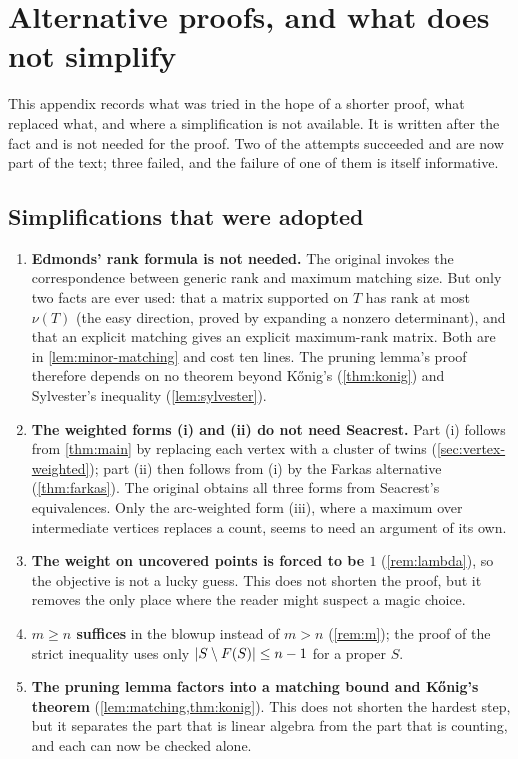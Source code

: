 \section{Alternative proofs, and what does not simplify}\label{app:alternatives}

This appendix records what was tried in the hope of a shorter proof, what replaced what, and where a
simplification is not available. It is written after the fact and is not needed for the proof. Two of
the attempts succeeded and are now part of the text; three failed, and the failure of one of them is
itself informative.

\subsection*{Simplifications that were adopted}

\begin{enumerate}[leftmargin=1.5em,itemsep=3pt,topsep=2pt]
\item \textbf{Edmonds' rank formula is not needed.} The original invokes the correspondence between
 generic rank and maximum matching size. But only two facts are ever used: that a matrix supported on
 $T$ has rank at most $\nu(T)$ (the easy direction, proved by expanding a nonzero determinant), and
 that an explicit matching gives an explicit maximum-rank matrix. Both are in
 \cref{lem:minor-matching} and cost ten lines. The pruning lemma's proof therefore depends on no
 theorem beyond K\H{o}nig's (\cref{thm:konig}) and Sylvester's inequality
 (\cref{lem:sylvester}).
\item \textbf{The weighted forms (i) and (ii) do not need Seacrest.} Part (i) follows from
 \cref{thm:main} by replacing each vertex with a cluster of twins (\cref{sec:vertex-weighted}); part
 (ii) then follows from (i) by the Farkas alternative (\cref{thm:farkas}). The original obtains all
 three forms from Seacrest's equivalences. Only the arc-weighted form (iii), where a maximum over
 intermediate vertices replaces a count, seems to need an argument of its own.
\item \textbf{The weight on uncovered points is forced to be $1$} (\cref{rem:lambda}), so the
 objective is not a lucky guess. This does not shorten the proof, but it removes the only place where
 the reader might suspect a magic choice.
\item \textbf{$m\ge n$ suffices} in the blowup instead of $m>n$ (\cref{rem:m}); the proof of the
 strict inequality uses only $\lvert S\setminus F(S)\rvert\le n-1$ for a proper $S$.
\item \textbf{The pruning lemma factors into a matching bound and K\H{o}nig's theorem}
 (\cref{lem:matching,thm:konig}). This does not shorten the hardest step, but it separates the part
 that is linear algebra from the part that is counting, and each can now be checked alone.
\end{enumerate}

